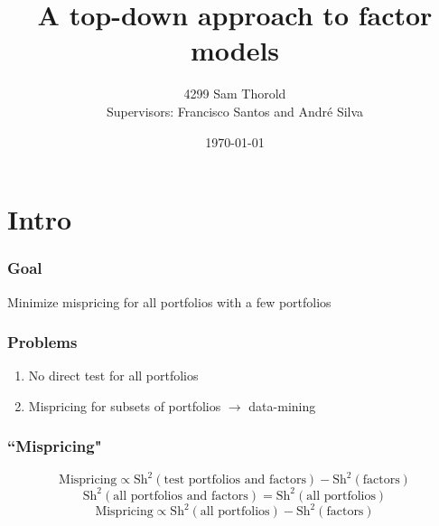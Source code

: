 \documentclass[notes]{beamer}  %
\title[Asset-Pricing]{A top-down approach to factor models}
\author[Thorold]{4299 Sam Thorold\\
                 Supervisors: Francisco Santos and Andr\'e Silva}
\institute{NHH and Nova SBE}
\date[June 2018]{\today}
\begin{document}
\frame{\titlepage}

\section{Intro}

\begin{frame} \frametitle{Goal}
  Minimize mispricing for all portfolios with a few portfolios
\end{frame}


\begin{frame} \frametitle{Problems}
  \begin{enumerate}
    \item No direct test for all portfolios
    \item Mispricing for subsets of portfolios $\rightarrow$ data-mining
  \end{enumerate}
\end{frame}


\begin{frame} \frametitle{``Mispricing"}
  \textcite{gibbons1989test}
  \[\text{Mispricing} \propto \text{Sh}^2(\text{test portfolios and factors}) - \text{Sh}^2(\text{factors})\]
  \textcite{barillas2016alpha}
  \[\text{Sh}^2(\text{all portfolios and factors}) = \text{Sh}^2(\text{all portfolios})\]
  \[\text{Mispricing} \propto \text{Sh}^2(\text{all portfolios}) - \text{Sh}^2(\text{factors})\]
\end{frame}

\end{document}
